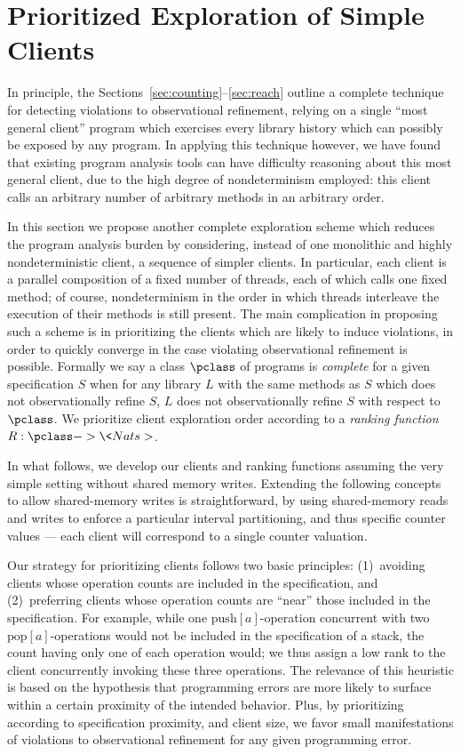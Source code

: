 \section{Prioritized Exploration of Simple Clients}
\label{sec:ranking}

In principle, the Sections~\ref{sec:counting}--\ref{sec:reach} outline
a complete technique for detecting violations to observational refinement,
relying on a single ``most general client'' program which exercises every
library history which can possibly be exposed by any program. In applying
this technique however, we have found that existing program analysis tools can
have difficulty reasoning about this most general client, due to the high
degree of nondeterminism employed: this client calls an arbitrary number of
arbitrary methods in an arbitrary order.

In this section we propose another complete exploration scheme which reduces
the program analysis burden by considering, instead of one monolithic and
highly nondeterministic client, a sequence of simpler clients. In particular,
each client is a parallel composition of a fixed number of threads, each of which
calls one fixed method; of course, nondeterminism in the order in which threads
interleave the execution of their methods is still present. The main complication
in proposing such a scheme is in prioritizing the clients which are likely to
induce violations, in order to quickly converge in the case violating
observational refinement is possible. Formally we say a class $\pclass$ of
programs is \emph{complete} for a given specification $S$ when for any library
$L$ with the same methods as $S$ which does not observationally refine $S$, $L$
does not observationally refine $S$ with respect to $\pclass$. We prioritize
client exploration order according to a \emph{ranking function} $R : \pclass ->
\<Nats>$.

In what follows, we develop our clients and ranking functions assuming the very
simple setting without shared memory writes. Extending the following concepts
to allow shared-memory writes is straightforward, by using shared-memory reads
and writes to enforce a particular interval partitioning, and thus specific
counter values --- each client will correspond to a single counter valuation.

Our strategy for prioritizing clients follows two basic principles:
(1)~avoiding clients whose operation counts are included in the specification,
and (2)~preferring clients whose operation counts are ``near'' those included
in the specification. For example, while one $\mathrm{push}[a]$-operation
concurrent with two $\mathrm{pop}[a]$-operations would not be included in the
specification of a stack, the count having only one of each operation would; we
thus assign a low rank to the client concurrently invoking these three
operations. The relevance of this heuristic is based on the hypothesis that
programming errors are more likely to surface within a certain proximity of the
intended behavior. Plus, by prioritizing according to specification proximity,
and client size, we favor small manifestations of violations to observational
refinement for any given programming error.

